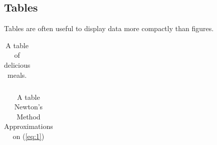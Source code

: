 \documentclass[12pt]{article}
\begin{document}
\subsection{Tables}
Tables are often useful to display data more compactly than figures.

\begin{table}[h]
\begin{centering}
  \begin{tabular}{| l | c |}
   \hline 
     
   \hline
  \end{tabular}
  \caption{A table of delicious meals. \label{tab:1}}
  \end{centering}
\end{table}

\begin{table}[h]
\begin{centering}
  \begin{tabular}{| l | c |}
   \hline 
     
   \hline
  \end{tabular}
  \caption{A table Newton's Method Approximations on (\ref{eq:1}) \label{tab:1}}
  \end{centering}
\end{table}

%
%
\end{document}
